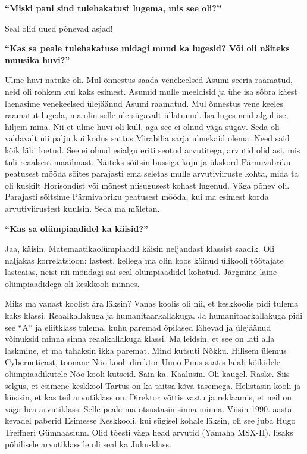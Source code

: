 \textbf{\enquote{Miski pani sind tulehakatust lugema, mis see oli?}}

Seal olid uued põnevad asjad!

\textbf{\enquote{Kas sa peale tulehakatuse midagi muud ka lugesid? Või oli
näiteks muusika huvi?}}

Ulme huvi natuke oli. Mul õnnestus saada venekeelsed Asumi seeria raamatud, neid
oli rohkem kui kaks esimest. Asumid mulle meeldisid ja ühe isa sõbra käest
laenasime venekeelsed ülejäänud Asumi raamatud. Mul õnnestus vene keeles
raamatut lugeda, ma olin selle üle sügavalt üllatunud. Isa luges neid algul
ise, hiljem mina. Nii et ulme huvi oli küll, aga see ei olnud väga sügav. Seda
oli valdavalt nii palju kui kodus sattus Mirabilia sarja ulmekaid olema. Need
said kõik läbi loetud. See ei olnud esialgu eriti seotud arvutitega, arvutid
olid asi, mis tuli reaalsest maailmast. Näiteks sõitsin bussiga koju ja ükskord
Pärmivabriku peatusest mööda sõites parajasti ema seletas mulle arvutiviiruste
kohta, mida ta oli kuskilt Horisondist või mõnest niisugusest kohast lugenud.
Väga põnev oli. Parajasti sõitsime Pärmivabriku peatusest mööda, kui ma esimest
korda arvutiviirustest kuulsin. Seda ma mäletan.

\textbf{\enquote{Kas sa olümpiaadidel ka käisid?}}

Jaa, käisin. Matemaatikaolümpiaadil käisin neljandast klassist saadik. Oli
naljakas korrelatsioon: lastest, kellega ma olin koos käinud ülikooli töötajate
lasteaias, neist nii mõndagi sai seal olümpiaadidel kohatud. Järgmine laine
olümpiaadidega oli keskkooli minnes.

Miks ma vanast koolist ära läksin? Vanas koolis oli nii, et keskkoolis pidi
tulema kaks klassi. Reaalkallakuga ja humanitaarkallakuga. Ja
humanitaarkallakuga pidi see \enquote{A} ja eliitklass tulema, kuhu paremad
õpilased lähevad ja ülejäänud võinuksid minna sinna reaalkallakuga klassi. Ma
leidsin, et see on lati alla laskmine, et ma tahaksin ikka paremat. Mind
kutsuti Nõkku. Hilisem ülemus
Cyberneticast, toonane Nõo kooli direktor Uuno
Puus saatis laiali kõikidele olümpiaadikutele Nõo kooli
kutseid. Sain ka. Kaalusin. Oli kaugel. Raske. Siis selgus, et esimene keskkool
Tartus on ka täitsa kõva tasemega. Helistasin
kooli ja küsisin, et kas teil arvutiklass on. Direktor võttis vastu ja
reklaamis, et neil on väga hea arvutiklass. Selle peale ma otsustasin sinna
minna. Viisin 1990. aasta kevadel paberid Esimesse Keskkooli, kui sügisel
kohale läksin, oli see juba Hugo Treffneri Gümnaasium. Olid tõesti väga head arvutid
(Yamaha MSX-II), lisaks põhilisele arvutiklassile oli seal ka
Juku-klass.

